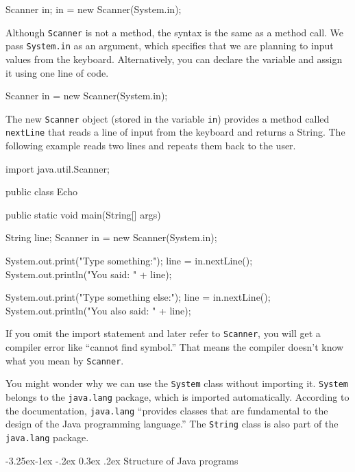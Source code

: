 \documentclass[12pt]{book}
\makeatletter
\theoremstyle{exercise}
\newcommand{\java}[1]{\verb"#1"}
\renewcommand\subsection{\@startsection{subsection}{2}{\z@}%
    {-3.25ex\@plus -1ex \@minus -.2ex}%
    {0.3ex \@plus .2ex}%
    {\normalfont\large\bfseries}}
\newcommand{\java}[1]{\lstinline{#1}} %
\makeatother
\begin{document}
\begin{code}
    Scanner in;
    in = new Scanner(System.in);
\end{code}


Although \java{Scanner} is not a method, the syntax is the same as a method call.
We pass \java{System.in} as an argument, which specifies that we are planning to input values from the keyboard.
Alternatively, you can declare the variable and assign it using one line of code.

\begin{code}
    Scanner in = new Scanner(System.in);
\end{code}

The new \java{Scanner} object (stored in the variable \java{in}) provides a method called \java{nextLine} that reads a line of input from the keyboard and returns a String.
The following example reads two lines and repeats them back to the user.

\begin{code}
import java.util.Scanner;

public class Echo {
    public static void main(String[] args) {
        String line;
        Scanner in = new Scanner(System.in);

        System.out.print("Type something:");
        line = in.nextLine();
        System.out.println("You said: " + line);

        System.out.print("Type something else:");
        line = in.nextLine();
        System.out.println("You also said: " + line);
    }
}
\end{code}

If you omit the import statement and later refer to \java{Scanner}, you will get a compiler error like ``cannot find symbol.''
That means the compiler doesn't know what you mean by \java{Scanner}.

You might wonder why we can use the \java{System} class without importing it.
\java{System} belongs to the \java{java.lang} package, which is imported automatically.
According to the documentation, \java{java.lang} ``provides classes that are fundamental to the design of the Java programming language.''
The \java{String} class is also part of the \java{java.lang} package.

\subsection{Structure of Java programs}
\label{sec:library}
\end{document}
